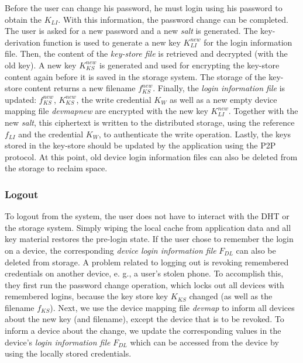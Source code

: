 Before the user can change his password, he must login using his password to
obtain the $K_{LI}$. With this information, the password change can be
completed. The user is asked for a new password and a new \textit{salt} is
generated. The key-derivation function is used to generate a new key
$K_{LI}^{new}$
for the login information file. Then, the content of the \textit{key-store
file} is
retrieved and decrypted (with the old key). A new key $K_{KS}^{new}$ is generated and
used for encrypting the key-store content again before it is saved in the
storage system. The storage of the key-store content returns a new filename $f_{KS}^{new}$.
Finally, the \textit{login information file}
is updated: $f_{KS}^{new}$, $K_{KS}^{new}$, the write credential $K_{W}$ as well as a new empty
device mapping file \textit{devmapnew} are encrypted with the new key $K_{LI}^{new}$.
  Together with the new \textit{salt}, this ciphertext is written to the distributed
storage, using the reference $f_{LI}$ and the credential $K_W$, to authenticate the
write operation. Lastly, the keys stored in the key-store should be updated by
the application using the P2P protocol.  At this point, old device login
information files can also be deleted from the
storage to reclaim space.

\subsubsection{Logout}

To logout from the system, the user does not have to interact
with the DHT or the storage system. Simply wiping the local
cache from application data and all key material restores the
pre-login state. If the user chose to remember the login on a
device, the corresponding \textit{device login information file} $F_{DL}$
can also be deleted from storage.
 A problem related to logging out is revoking remembered
credentials on another device, e. g., a user’s stolen phone. To
accomplish this, they first run the password change operation,
which locks out all devices with remembered logins, because
the key store key $K_{KS}$ changed (as well as the filename $f_{KS}$).
Next, we use the device mapping file \textit{devmap} to inform all devices
about the new key (and filename), except the device that is to
be revoked. To inform a device about the change, we update
the corresponding values in the device’s \textit{login information file}
 $F_{DL}$ which can be accessed from the device by using the
locally stored credentials.

